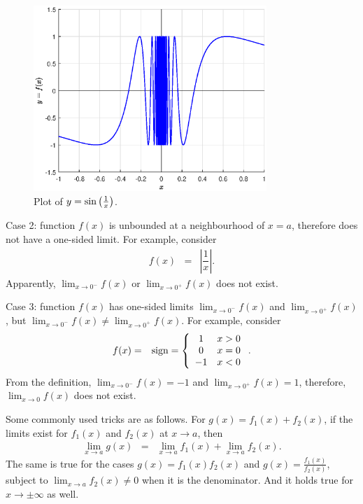 \begin{figure}
\centering
\includegraphics[width=250pt]{chapters/part-1/figures/fig_sinoneoverx.eps}
\caption{Plot of $y=\textup{sin}\left(\frac{1}{x}\right)$.} \label{ch1fig:sinoneoverx}
\end{figure}

Case 2: function $f(x)$ is unbounded at a neighbourhood of $x=a$, therefore does not have a one-sided limit. For example, consider
\begin{eqnarray}
  f(x) &=& \left|\dfrac{1}{x}\right|. \nonumber
\end{eqnarray}
Apparently, $\lim_{x\rightarrow 0^-}f(x)$ or $\lim_{x\rightarrow 0^+}f(x)$ does not exist.

Case 3: function $f(x)$ has one-sided limits $\lim_{x\rightarrow 0^-}f(x)$ and $\lim_{x\rightarrow 0^+}f(x)$, but $\lim_{x\rightarrow 0^-}f(x) \neq \lim_{x\rightarrow 0^+}f(x)$. For example, consider
\begin{eqnarray}
  f(x) &=& \textup{sign} = \left\{\begin{array}{cc}
                                    1 & x > 0 \\
                                    0 & x = 0 \\
                                    -1 & x < 0
                                  \end{array}\right..\nonumber
\end{eqnarray}
From the definition, $\lim_{x\rightarrow 0^-}f(x)=-1$ and $\lim_{x\rightarrow 0^+}f(x)=1$, therefore, $\lim_{x\rightarrow 0}f(x)$ does not exist.

Some commonly used tricks are as follows. For $g(x)=f_1(x) + f_2(x)$, if the limits exist for $f_1(x)$ and $f_2(x)$ at $x \rightarrow a$, then
\begin{eqnarray}
  \lim_{x \rightarrow a}g(x) &=& \lim_{x \rightarrow a}f_1(x) + \lim_{x \rightarrow a}f_2(x). \nonumber
\end{eqnarray}
The same is true for the cases $g(x)=f_1(x)f_2(x)$ and $g(x)=\frac{f_1(x)}{f_2(x)}$, subject to $\lim_{x \rightarrow a}f_2(x) \neq 0$ when it is the denominator. And it holds true for $x \rightarrow \pm \infty$ as well.

